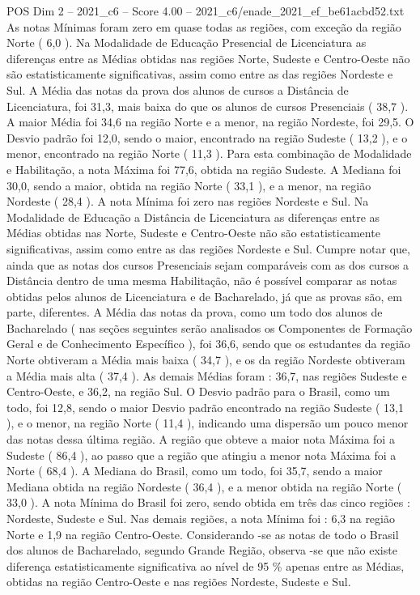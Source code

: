 \begin{textsample}{POS Dim 2 – 2021\_c6 – Score 4.00 – 2021\_c6/enade\_2021\_ef\_be61acbd52.txt}
As notas Mínimas foram zero em quase todas as regiões, com exceção da região Norte ( 6,0 ).
Na Modalidade de Educação Presencial de Licenciatura as diferenças entre as Médias obtidas nas regiões Norte, Sudeste e Centro-Oeste não são estatisticamente significativas, assim como entre as das regiões Nordeste e Sul.
A Média das notas da prova dos alunos de cursos a Distância de Licenciatura, foi 31,3, mais baixa do que os alunos de cursos Presenciais ( 38,7 ).
A maior Média foi 34,6 na região Norte e a menor, na região Nordeste, foi 29,5.
O Desvio padrão foi 12,0, sendo o maior, encontrado na região Sudeste ( 13,2 ), e o menor, encontrado na região Norte ( 11,3 ).
Para esta combinação de Modalidade e Habilitação, a nota Máxima foi 77,6, obtida na região Sudeste.
A Mediana foi 30,0, sendo a maior, obtida na região Norte ( 33,1 ), e a menor, na região Nordeste ( 28,4 ).
A nota Mínima foi zero nas regiões Nordeste e Sul.
Na Modalidade de Educação a Distância de Licenciatura as diferenças entre as Médias obtidas nas Norte, Sudeste e Centro-Oeste não são estatisticamente significativas, assim como entre as das regiões Nordeste e Sul.
Cumpre notar que, ainda que as notas dos cursos Presenciais sejam comparáveis com as dos cursos a Distância dentro de uma mesma Habilitação, não é possível comparar as notas obtidas pelos alunos de Licenciatura e de Bacharelado, já que as provas são, em parte, diferentes.
A Média das notas da prova, como um todo dos alunos de Bacharelado ( nas seções seguintes serão analisados os Componentes de Formação Geral e de Conhecimento Específico ), foi 36,6, sendo que os estudantes da região Norte obtiveram a Média mais baixa ( 34,7 ), e os da região Nordeste obtiveram a Média mais alta ( 37,4 ).
As demais Médias foram : 36,7, nas regiões Sudeste e Centro-Oeste, e 36,2, na região Sul.
O Desvio padrão para o Brasil, como um todo, foi 12,8, sendo o maior Desvio padrão encontrado na região Sudeste ( 13,1 ), e o menor, na região Norte ( 11,4 ), indicando uma dispersão um pouco menor das notas dessa última região.
A região que obteve a maior nota Máxima foi a Sudeste ( 86,4 ), ao passo que a região que atingiu a menor nota Máxima foi a Norte ( 68,4 ).
A Mediana do Brasil, como um todo, foi 35,7, sendo a maior Mediana obtida na região Nordeste ( 36,4 ), e a menor obtida na região Norte ( 33,0 ).
A nota Mínima do Brasil foi zero, sendo obtida em três das cinco regiões : Nordeste, Sudeste e Sul.
Nas demais regiões, a nota Mínima foi : 6,3 na região Norte e 1,9 na região Centro-Oeste.
Considerando -se as notas de todo o Brasil dos alunos de Bacharelado, segundo Grande Região, observa -se que não existe diferença estatisticamente significativa ao nível de 95 \% apenas entre as Médias, obtidas na região Centro-Oeste e nas regiões Nordeste, Sudeste e Sul.

\end{textsample}
